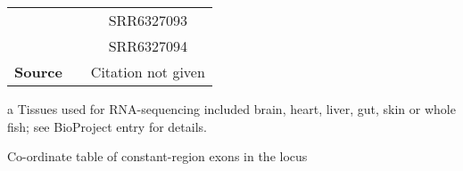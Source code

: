 \begin{table}
\begin{threeparttable}
\begin{tabular}{>{\bfseries}c|c|c}
&&SRR6327093\\
&&SRR6327094\\\midrule
Source & \parencite{smith2017microbiota} & Citation not given\\
\bottomrule\end{tabular} %
	\begin{tablenotes}
	\item[a] Tissues used for \Xma RNA-sequencing included brain, heart, liver, gut, skin or whole fish; see BioProject entry for details.
	\end{tablenotes}
\end{threeparttable}
\label{tab:rnaseq-sources}
\end{table}

\centering

\begin{table}\centering
    \caption{Co-ordinate table of constant-region exons in the \nfu \igh{} locus}
    	
    \label{tab:nfu-ch-coords}
\end{table}

    \begin{landscape}
        \centering
        \vspace*{\fill}
        \scriptsize
		
		\normalsize\vspace{1em}
        \label{tab:nfu-vh-coords}
        \vspace*{\fill}
    \end{landscape}

        {\centering
        \vspace{-0.3em}
        \label{tab:nfu-dh-coords-seg}
        \scriptsize
		
		\normalsize\vspace{1em}
        \vspace{-0.3em}
        \label{tab:nfu-dh-coords-rss5}
        \scriptsize
        	
        	\normalsize\vspace{1em}
        \vspace{-0.3em}
        \label{tab:nfu-dh-coords-rss3}
        \scriptsize
		
		\normalsize
		}

